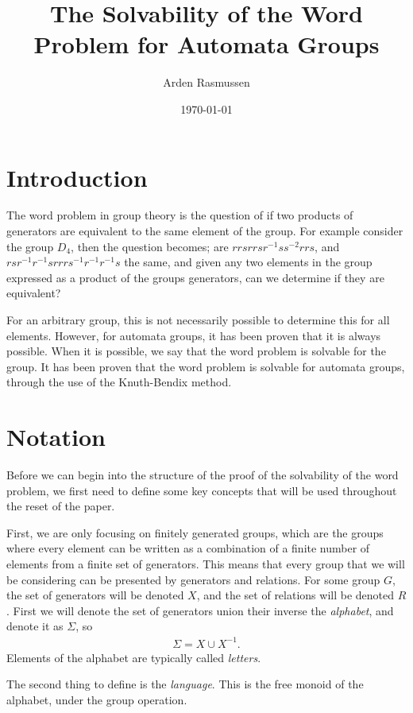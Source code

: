 \documentclass[10pt]{amsart}
\title{The Solvability of the Word Problem for Automata Groups}
\author{Arden Rasmussen}
\date{\today}
\theoremstyle{definition}
\theoremstyle{remark}
\begin{document}
\maketitle

\section{Introduction}%
\label{sec:Introduction}

The word problem in group theory is the question of if two products of
generators are equivalent to the same element of the group. For example
consider the group $D_4$, then the question becomes; are
$rrsrrsr^{-1}ss^{-2}rrs$, and $rsr^{-1}r^{-1}srrrs^{-1}r^{-1}r^{-1}s$ the
same, and given any two elements in the group expressed as a product of the
groups generators, can we determine if they are equivalent?

For an arbitrary group, this is not necessarily possible to determine this for
all elements. However, for automata groups, it has been proven that it is
always possible. When it is possible, we say that the word problem is solvable
for the group. It has been proven that the word problem is solvable for
automata groups, through the use of the Knuth-Bendix method.

\section{Notation}%
\label{sec:Notation}

Before we can begin into the structure of the proof of the solvability of the
word problem, we first need to define some key concepts that will be used
throughout the reset of the paper.

First, we are only focusing on finitely generated groups, which are the groups
where every element can be written as a combination of a finite number of
elements from a finite set of generators. This means that every group that we
will be considering can be presented by generators and relations. For some
group $G$, the set of generators will be denoted $X$, and the set of relations
will be denoted $R$. First we will denote the set of generators union their
inverse the \textit{alphabet}, and denote it as $\Sigma$, so
\begin{align*}
  \Sigma=X\cup X^{-1}.
\end{align*}
Elements of the alphabet are typically called \textit{letters}.

The second thing to define is the \textit{language}. This is the free monoid of the
alphabet, under the group operation.
\end{document}

